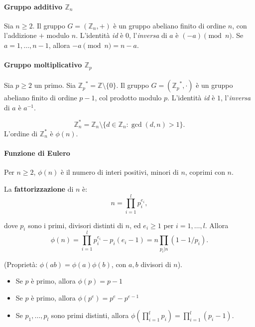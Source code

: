 \paragraph{Gruppo additivo $\mathbb{Z}_n$} 
    Sia $n\geq 2$. Il gruppo $G=(\mathbb{Z}_n,+)$ è un gruppo abeliano finito di ordine $n$, con l'addizione $+$ modulo $n$. L'identità \textit{id} è $0$, l'\textit{inversa} di $a$ è $(-a) \pmod n$. Se $a=1, \dots, n-1$, allora $-a \pmod n=n-a$.


\paragraph{Gruppo moltiplicativo $\mathbb{Z}_p$}
    Sia $p\geq 2$ un primo. Sia ${\mathbb{Z}_p}^*=\mathbb{Z}\setminus\{0\}$. Il gruppo $G=({\mathbb{Z}_p}^*,\cdot)$ è un gruppo abeliano finito di ordine $p-1$, col prodotto modulo $p$. L'identità \textit{id} è $1$, l'\textit{inversa} di $a$ è $a^{-1}$. 
    
    \vspace{1em}
    \[
        \mathbb{Z}_n^*=\mathbb{Z}_n \setminus \{ d \in \mathbb{Z}_n : \gcd(d,n) > 1\}. 
    \]
    L'ordine di $\mathbb{Z}_n^*$ è $\phi(n)$. 


\paragraph{Funzione di Eulero}
    Per $n \geq 2$, $\phi(n)$ è il numero di interi positivi, minori di $n$, coprimi con $n$.  


\begin{theorem}
    La \textbf{fattorizzazione} di $n$ è:
    \[
    n=\prod_{i=1}^{l}p_i^{e_i}, 
    \] 
    
    dove $p_i$ sono i primi, divisori distinti di $n$, ed $e_i \geq 1 $ per $i=1, \dots, l$. Allora 
    \[
    \phi(n)=\prod_{i=1}^{l}p_i^{e_i}-p_i(e_i-1)=n\prod_{p_i|n}(1-1/p_i).
    \]
\end{theorem} 

(Proprietà: $\phi(ab)=\phi(a)\phi(b)$, con $a,b$ divisori di $n$). 

\begin{corollary}
    \begin{itemize}
        \item Se $p$ è primo, allora $\phi(p)=p-1$
        \item Se $p$ è primo, allora $\phi(p^e)=p^e-p^{e-1}$
        \item Se $p_1, \dots, p_l$ sono primi distinti, allora $\phi(\prod_{i=1}^{l}p_i)=\prod_{i=1}^{l}(p_i-1)$.
    \end{itemize}
\end{corollary}

